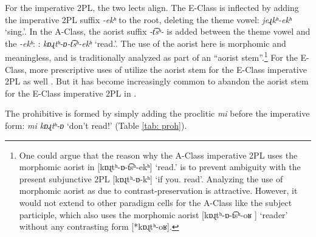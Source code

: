 	
	For the imperative 2PL, the two lects align. The E-Class is inflected by adding the imperative 2PL suffix \textit{{-ekʰ}} to the root, deleting the theme vowel: \textit{jeɻkʰ-ekʰ} `sing.{\pl}'. In the A-Class, the aorist suffix \textit{{-t͡sʰ-}} is added between the theme vowel and the \textit{{-ekʰ}}: : \textit{kɒɻtʰ-ɒ-t͡sʰ-ekʰ} `read.{\pl}'. The use of the aorist here is morphomic and meaningless, and is traditionally analyzed as part of an “aorist stem”.{\footnote{One could argue that the reason why the A-Class imperative 2PL uses the morphomic aorist in [{{kɒɻtʰ-ɒ-t͡sʰ-ekʰ}}] `read.{\pl}' is to prevent ambiguity with the present subjunctive 2PL [{{kɒɻtʰ-ɒ-kʰ}}] `if you.{\pl} read'. Analyzing the use of morphomic aorist as due to contrast-preservation is attractive. However, it would not extend to other paradigm cells for the A-Class like the subject participle, which also uses the morphomic aorist [{{kɒɻtʰ-ɒ-t͡sʰ-oʁ}} ] `reader’ without any contrasting form [{{*kɒɻtʰ-oʁ}}].}}
	For the E-Class, more prescriptive uses of {\seaSEA} utilize the aorist stem for the E-Class imperative 2PL as well \citep[272]{DumTragut-2009-ArmenianReferenceGrammar}. But it has become increasingly common to abandon the aorist stem for the E-Class imperative 2PL in {\seaSEA}.
	
	The prohibitive is formed by simply adding the proclitic \textit{{mi}} before the imperative form: \textit{mi kɒɻtʰ-ɒ} `don't read!' (Table \ref{tab: proh}). 
	
	
	
